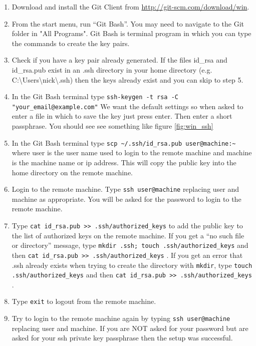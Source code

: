\documentclass[11pt]{amsart}
\begin{document}
\begin{enumerate}
\item Download and install the Git Client from \href{http://git-scm.com/download/win}{http://git-scm.com/download/win}.
\item From the start menu, run ``Git Bash''. You may need to navigate to the Git folder in "All Programs". Git Bash is terminal program in which you can type the commands to create the key pairs.
\item Check if you have a key pair already generated. If the files id\_rsa and id\_rsa.pub exist in an .ssh directory in your home directory (e.g. C:\textbackslash Users\textbackslash nick\textbackslash .ssh) then the keys already exist and you can skip to step 5.
\item In the Git Bash terminal type {\tt ssh-keygen -t rsa -C "your\_email@example.com"} We want the default settings so when asked to enter a file in which to save the key just press enter. Then enter a short passphrase. You should see see something like figure \ref{fig:win_ssh}
\item In the Git Bash terminal type {\tt scp \textasciitilde/.ssh/id\_rsa.pub user@machine:\textasciitilde} where user is the user name used to login to the remote machine and machine is the machine name or ip address. This will copy the public key into the home directory on the remote machine.
\item Login to the remote machine. Type {\tt ssh user@machine} replacing user and machine as appropriate. You will be asked for the password to login to the remote machine.
\item Type {\tt cat id\_rsa.pub >> .ssh/authorized\_keys} to add the public key to the list of authorized keys on the remote machine. If you get a ``no such file or directory'' message, type {\tt mkdir .ssh; touch .ssh/authorized\_keys} and then  {\tt cat id\_rsa.pub >> .ssh/authorized\_keys} . If you get an error that .ssh already exists when trying to create the directory with {\tt mkdir}, type {\tt touch .ssh/authorized\_keys} and then  {\tt cat id\_rsa.pub >> .ssh/authorized\_keys} .
\item Type {\tt exit} to logout from the remote machine.
\item Try to login to the remote machine again by typing {\tt ssh user@machine} replacing user and machine. If you are NOT asked for your password but are asked for your ssh private key passphrase then the setup was successful.
\end{enumerate}
\end{document}
